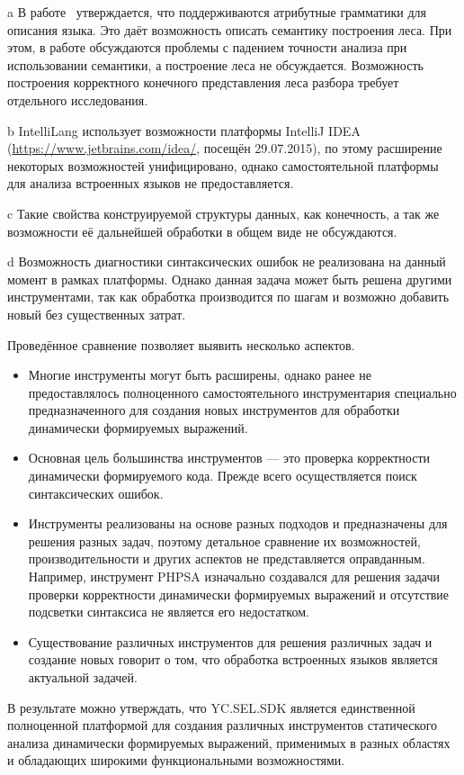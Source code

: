 \begin{table} [htbp]
\begin{threeparttable}
\begin{tablenotes}
            \item[a] В работе~\cite{LRAbstractParsingSema} утверждается, что поддерживаются атрибутные грамматики для описания языка. Это даёт возможность описать семантику построения леса. При этом, в работе обсуждаются проблемы с падением точности анализа при использовании семантики, а построение леса не обсуждается. Возможность построения корректного конечного представления леса разбора требует отдельного исследования.
            \item[b] IntelliLang использует возможности платформы IntelliJ IDEA (\url{https://www.jetbrains.com/idea/}, посещён 29.07.2015), по этому расширение некоторых возможностей унифицировано, однако самостоятельной платформы для анализа встроенных языков не предоставляется.
            \item[c] Такие свойства конструируемой структуры данных, как конечность, а так же возможности её дальнейшей обработки в общем виде не обсуждаются.
            \item[d] Возможность диагностики синтаксических ошибок не реализована на данный момент в рамках платформы. Однако данная задача может быть решена другими инструментами, так как обработка производится по шагам и возможно добавить новый без существенных затрат.
  \end{tablenotes}
  \end{threeparttable}
\end{table}

Проведённое сравнение позволяет выявить несколько аспектов.
\begin{itemize}
    \item Многие инструменты могут быть расширены, однако ранее не предоставлялось полноценного самостоятельного инструментария специально предназначенного для создания новых инструментов для обработки динамически формируемых выражений.
    \item Основная цель большинства инструментов --- это проверка корректности динамически формируемого кода. Прежде всего осуществляется поиск синтаксических ошибок.
    \item Инструменты реализованы на основе разных подходов и предназначены для решения разных задач, поэтому детальное сравнение их возможностей, производительности и других аспектов не представляется оправданным. Например, инструмент PHPSA изначально создавался для решения задачи проверки корректности динамически формируемых выражений и отсутствие подсветки синтаксиса не является его недостатком.
    \item Существование различных инструментов для решения различных задач и создание новых говорит о том, что обработка встроенных языков является актуальной задачей.
\end{itemize}

В результате можно утверждать, что YC.SEL.SDK является единственной полноценной платформой для создания различных инструментов статического анализа динамически формируемых выражений, применимых в разных областях и обладающих широкими функциональными возможностями.


